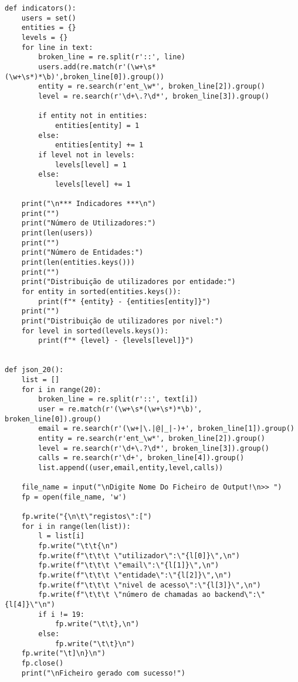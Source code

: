 \documentclass[11pt,a4paper]{report}%
\begin{document}
\begin{verbatim}
def indicators():
    users = set()
    entities = {}
    levels = {}
    for line in text:
        broken_line = re.split(r'::', line)
        users.add(re.match(r'(\w+\s*(\w+\s*)*\b)',broken_line[0]).group())
        entity = re.search(r'ent_\w*', broken_line[2]).group()
        level = re.search(r'\d+\.?\d*', broken_line[3]).group()

        if entity not in entities:
            entities[entity] = 1
        else:
            entities[entity] += 1
        if level not in levels:
            levels[level] = 1
        else:
            levels[level] += 1

    print("\n*** Indicadores ***\n")
    print("")
    print("Número de Utilizadores:")
    print(len(users))
    print("")
    print("Número de Entidades:")
    print(len(entities.keys()))
    print("")
    print("Distribuição de utilizadores por entidade:")
    for entity in sorted(entities.keys()):
        print(f"* {entity} - {entities[entity]}")
    print("")
    print("Distribuição de utilizadores por nivel:")
    for level in sorted(levels.keys()):
        print(f"* {level} - {levels[level]}")


def json_20():
    list = []
    for i in range(20):
        broken_line = re.split(r'::', text[i])
        user = re.match(r'(\w+\s*(\w+\s*)*\b)', broken_line[0]).group()
        email = re.search(r'(\w+|\.|@|_|-)+', broken_line[1]).group()
        entity = re.search(r'ent_\w*', broken_line[2]).group()
        level = re.search(r'\d+\.?\d*', broken_line[3]).group()
        calls = re.search(r'\d+', broken_line[4]).group()
        list.append((user,email,entity,level,calls))

    file_name = input("\nDigite Nome Do Ficheiro de Output!\n>> ")
    fp = open(file_name, 'w')

    fp.write("{\n\t\"registos\":[")
    for i in range(len(list)):
        l = list[i]
        fp.write("\t\t{\n")
        fp.write(f"\t\t\t \"utilizador\":\"{l[0]}\",\n")
        fp.write(f"\t\t\t \"email\":\"{l[1]}\",\n")
        fp.write(f"\t\t\t \"entidade\":\"{l[2]}\",\n")
        fp.write(f"\t\t\t \"nivel de acesso\":\"{l[3]}\",\n")
        fp.write(f"\t\t\t \"número de chamadas ao backend\":\"{l[4]}\"\n")
        if i != 19:
            fp.write("\t\t},\n")
        else:
            fp.write("\t\t}\n")
    fp.write("\t]\n}\n")
    fp.close()
    print("\nFicheiro gerado com sucesso!")





\end{verbatim}
\end{document}
